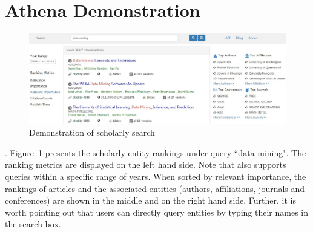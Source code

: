 \section{Athena Demonstration}
\label{sec-demo}

\begin{figure}[tp]
\centering
\includegraphics[width=\textwidth]{searchKeywords.pdf}
\vspace{-3ex}
\caption{Demonstration of scholarly search}
\label{fig:searchKeywords}
\vspace{-3ex}
\end{figure}






.
Figure~\ref{fig:searchKeywords} presents the scholarly entity rankings under query ``data mining".
The ranking metrics are displayed on the left hand side. Note that \oursystem also supports queries within a specific range of years.
When sorted by relevant importance, the rankings of articles and the associated entities (authors, affiliations, journals and conferences) are shown in the middle and on the right hand side.
Further, it is worth pointing out that users can directly query entities by typing their names in the search box. %

